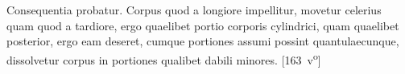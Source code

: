 \pend 
\pstart Consequentia probatur. Corpus quod a longiore impellitur, movetur celerius quam quod a tardiore, ergo quaelibet portio  corporis cylindrici,  quam quaelibet posterior, ergo eam deseret, cumque portiones assumi possint quantulaecunque, dissolvetur corpus in portiones qualibet dabili minores.
\pend
\count{}
\count{}
\count{}
\pstart%
[163~v\textsuperscript{o}]
\pend%